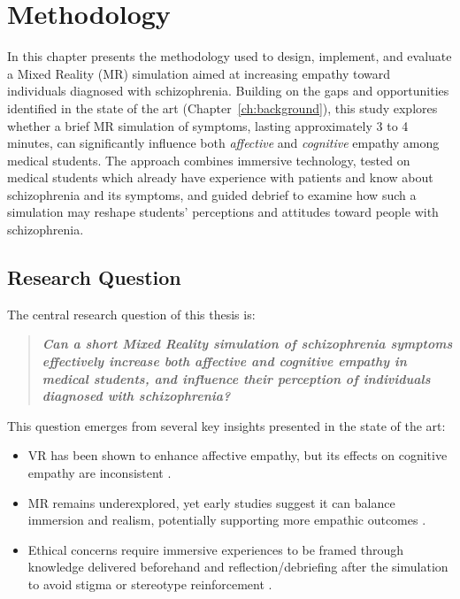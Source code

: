 \chapter{Methodology}
\label{ch:method}

In this chapter presents the methodology used to design, implement, and evaluate a Mixed Reality (MR) simulation aimed at increasing empathy toward individuals diagnosed with schizophrenia. Building on the gaps and opportunities identified in the state of the art (Chapter~\ref{ch:background}), this study explores whether a brief MR simulation of symptoms, lasting approximately 3 to 4 minutes, can significantly influence both \textit{affective} and \textit{cognitive} empathy among medical students. The approach combines immersive technology, tested on medical students which already have experience with patients and know about schizophrenia and its symptoms, and guided debrief to examine how such a simulation may reshape students' perceptions and attitudes toward people with schizophrenia.

\section{Research Question}

The central research question of this thesis is:

\begin{quote}
\textit{\textbf{Can a short Mixed Reality simulation of schizophrenia symptoms effectively increase both affective and cognitive empathy in medical students, and influence their perception of individuals diagnosed with schizophrenia?}}
\end{quote}

This question emerges from several key insights presented in the state of the art:

\begin{itemize}
    \item VR has been shown to enhance affective empathy, but its effects on cognitive empathy are inconsistent \cite{Martingano2021, Ventura2020}.
    \item MR remains underexplored, yet early studies suggest it can balance immersion and realism, potentially supporting more empathic outcomes \cite{Silva2017, Krogmeier2024}.
    \item Ethical concerns require immersive experiences to be framed through knowledge delivered beforehand and reflection/debriefing after the simulation to avoid stigma or stereotype reinforcement \cite{Rueda2020, Ando2011}.
\end{itemize}


